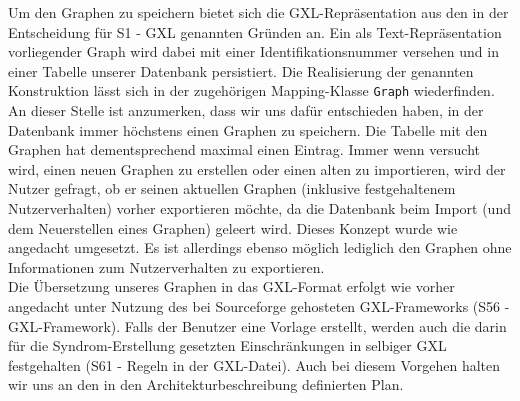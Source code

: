 \documentclass[enabledeprecatedfontcommands,fontsize=11pt,paper=a4,twoside]{scrartcl}
\newcounter{one}
\begin{document}
Um den Graphen zu speichern bietet sich die GXL-Repräsentation aus den in der Entscheidung für S1 - GXL genannten Gründen an. Ein als Text-Repräsentation vorliegender Graph wird dabei mit einer Identifikationsnummer versehen und in einer Tabelle unserer Datenbank persistiert. Die Realisierung der genannten Konstruktion lässt sich in der zugehörigen Mapping-Klasse \texttt{Graph} wiederfinden.  An dieser Stelle ist anzumerken, dass wir uns dafür entschieden haben, in der Datenbank immer höchstens einen Graphen zu speichern. Die Tabelle mit den Graphen hat dementsprechend maximal einen Eintrag. Immer wenn versucht wird, einen neuen Graphen zu erstellen oder einen alten zu importieren, wird der Nutzer gefragt, ob er seinen aktuellen Graphen (inklusive festgehaltenem Nutzerverhalten) vorher exportieren möchte, da die Datenbank beim Import (und dem Neuerstellen eines Graphen) geleert wird. Dieses Konzept wurde wie angedacht umgesetzt. Es ist allerdings ebenso möglich lediglich den Graphen ohne Informationen zum Nutzerverhalten zu exportieren.\\
Die Übersetzung unseres Graphen in das GXL-Format erfolgt wie vorher angedacht unter Nutzung des bei Sourceforge gehosteten GXL-Frameworks (S56 - GXL-Framework). Falls der Benutzer eine Vorlage erstellt, werden auch die darin für die Syndrom-Erstellung gesetzten Einschränkungen in selbiger GXL festgehalten (S61 - Regeln in der GXL-Datei). Auch bei diesem Vorgehen halten wir uns an den in den Architekturbeschreibung definierten Plan.\\ 
\end{document}
